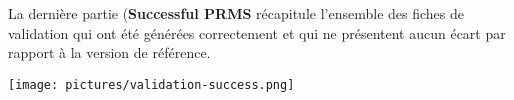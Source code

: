 \begin{minipage}[c]{0.5\linewidth}
La dernière partie (\textbf{Successful PRMS} récapitule l'ensemble des fiches de validation
qui ont été générées correctement et qui ne présentent aucun écart par rapport à la version de référence.
\end{minipage} \hfill
\begin{minipage}[c]{0.45\linewidth}
   \texttt{[image: pictures/validation-success.png]}\vspace*{0.2cm}
\vspace{0.6cm}   
\end{minipage}

